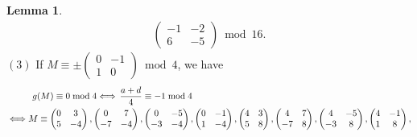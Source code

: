 \documentclass[12pt]{article}
\theoremstyle{definition}
\newtheorem{lemma}[theorem]{Lemma}
\numberwithin{equation}{section}
\numberwithin{theorem}{section}
\begin{document}
\begin{lemma}
{\begin{align*}
\begin{pmatrix}
-1 & -2 \\
6 & -5
\end{pmatrix}
\bmod{16}.
\end{align*}
$\mathrm{(3)}$ If 
$
M
\equiv
\pm
\begin{pmatrix}
0 & -1 \\
1 & 0
\end{pmatrix}
\bmod{4}
$, 
we have 
\begin{align}
&\hspace{10mm}  g(M)\equiv 0 \bmod{4} 
\Longleftrightarrow
\, \frac{a+d}{4}\equiv -1 \bmod{4}  \notag \\
&\Longleftrightarrow
M
\equiv
\begin{pmatrix}
0 & 3 \\
5 & -4
\end{pmatrix}, 
\begin{pmatrix}
0 & 7 \\
-7 & -4
\end{pmatrix}, 
\begin{pmatrix}
0 & -5 \\
-3 & -4
\end{pmatrix}, 
\begin{pmatrix}
0 & -1 \\
1 & -4
\end{pmatrix},  
\begin{pmatrix}
4 & 3 \\
5 & 8
\end{pmatrix}, 
\begin{pmatrix}
4 & 7 \\
-7 & 8
\end{pmatrix}, 
\begin{pmatrix}
4 & -5 \\
-3 & 8
\end{pmatrix}, 
\begin{pmatrix}
4 & -1 \\
1 & 8
\end{pmatrix}, \notag \\

\end{align}}
\end{lemma}
\end{document}
